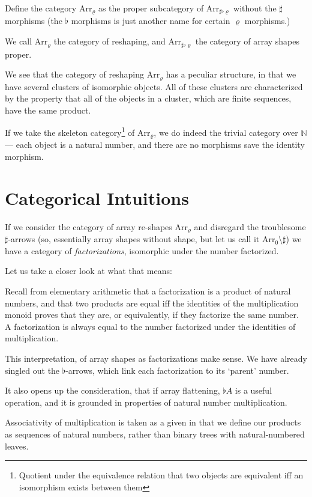 \documentclass{DIKU-report-variant}
\newcommand\mrm[1]{\mathrm{#1}}
\newcommand\brm[1]{\bm{\mrm{#1}}}
\newcommand\Nat{\mathbb{N}}
\newcommand\Arr[1]{{\brm{Arr}_{\brm{#1}}}}
\newcommand\SFR{\sharp\flat\varrho}
\begin{document}
\begin{definition}
  Define the category \(\Arr\varrho\) as the proper subcategory of \(\Arr\SFR\) without the
  \(\sharp\) morphisms (the \(\flat\) morphisms is just another name for certain \(\varrho\) morphisms.)

  We call \(\Arr\varrho\) the category of reshaping, and \(\Arr\SFR\) the category of array
  shapes proper.
\end{definition}

We see that the category of reshaping \(\Arr\varrho\) has a peculiar structure,
in that we have several clusters of isomorphic objects. All of these clusters are characterized by the property
that all of the objects in a cluster, which are finite sequences, have the same product.

If we take the skeleton category\footnote{Quotient under the equivalence relation that
two objects are equivalent iff an isomorphism exists between them} of \(\Arr\varrho\), we do indeed
the trivial category over \(\Nat\) --- each object is a natural number, and there are no morphisms
save the identity morphism.

\section{Categorical Intuitions}

If we consider the category of array re-shapes \(\Arr\varrho\) and disregard the troublesome
\(\sharp\)-arrows (so, essentially array shapes without shape, but let us call it \(\Arr0\setminus\sharp\))
we have a category of \emph{factorizations}, isomorphic under the number factorized.

Let us take a closer look at what that means: 

Recall from elementary arithmetic that a factorization is a product of
natural numbers, and that two products are equal iff the identities of
the multiplication monoid proves that they are, or equivalently,
if they factorize the same number. A factorization is always equal to
the number factorized under the identities of multiplication.

This interpretation, of array shapes as factorizations make sense. We have
already singled out the \(\flat\)-arrows, which link each factorization to
its `parent' number.

It also opens up the consideration, that if array flattening, \(\flat A\) is
a useful operation, and it is grounded in properties of natural number multiplication.

Associativity of multiplication is taken as a given in that we define our
products as sequences of natural numbers, rather than binary trees with natural-numbered
leaves.
\end{document}
